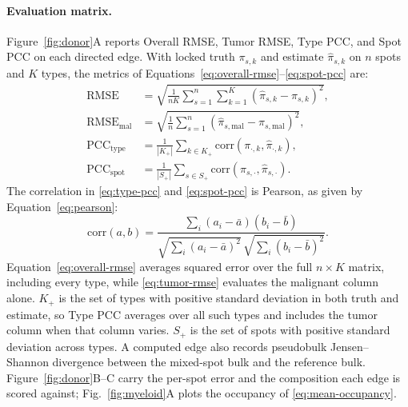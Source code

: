 \paragraph{Evaluation matrix.}
Figure~\ref{fig:donor}A reports Overall RMSE, Tumor RMSE, Type PCC, and Spot PCC on each directed edge. With locked truth \(\pi_{s,k}\) and estimate \(\hat\pi_{s,k}\) on \(n\) spots and \(K\) types, the metrics of Equations~\eqref{eq:overall-rmse}--\eqref{eq:spot-pcc} are:
\begin{align}
\mathrm{RMSE}
&= \sqrt{\frac{1}{nK}\sum_{s=1}^{n}\sum_{k=1}^{K}(\hat\pi_{s,k}-\pi_{s,k})^{2}},
\label{eq:overall-rmse}\\
\mathrm{RMSE}_{\mathrm{mal}}
&= \sqrt{\frac{1}{n}\sum_{s=1}^{n}(\hat\pi_{s,\mathrm{mal}}-\pi_{s,\mathrm{mal}})^{2}},
\label{eq:tumor-rmse}\\
\mathrm{PCC}_{\mathrm{type}}
&= \frac{1}{|K_+|}\sum_{k\in K_+}\mathrm{corr}(\pi_{\cdot,k},\hat\pi_{\cdot,k}),
\label{eq:type-pcc}\\
\mathrm{PCC}_{\mathrm{spot}}
&= \frac{1}{|S_+|}\sum_{s\in S_+}\mathrm{corr}(\pi_{s,\cdot},\hat\pi_{s,\cdot}).
\label{eq:spot-pcc}
\end{align}
The correlation in \eqref{eq:type-pcc} and \eqref{eq:spot-pcc} is Pearson, as given by Equation~\eqref{eq:pearson}:
\begin{equation}
\mathrm{corr}(a,b)=\frac{\sum_{i}(a_i-\bar a)(b_i-\bar b)}{\sqrt{\sum_{i}(a_i-\bar a)^{2}}\,\sqrt{\sum_{i}(b_i-\bar b)^{2}}}.
\label{eq:pearson}
\end{equation}
Equation~\eqref{eq:overall-rmse} averages squared error over the full \(n\times K\) matrix, including every type, while \eqref{eq:tumor-rmse} evaluates the malignant column alone. \(K_+\) is the set of types with positive standard deviation in both truth and estimate, so Type PCC averages over all such types and includes the tumor column when that column varies. \(S_+\) is the set of spots with positive standard deviation across types. A computed edge also records pseudobulk Jensen--Shannon divergence between the mixed-spot bulk and the reference bulk. Figure~\ref{fig:donor}B--C carry the per-spot error and the composition each edge is scored against; Fig.~\ref{fig:myeloid}A plots the occupancy of \eqref{eq:mean-occupancy}.

